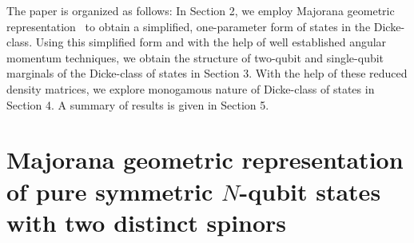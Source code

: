 \documentclass[pra,a4paper,showpacs,superscriptaddress]{revtex4}
\begin{document}
The paper is organized as follows: In Section 2, we employ Majorana geometric representation~\cite{maj,solano,bastin,usrmaj,ref2a,ref2b} to obtain a simplified, one-parameter form of states in the Dicke-class. Using this simplified form and with the help of well established angular momentum techniques, we obtain the structure of two-qubit and single-qubit marginals of the Dicke-class of states in Section 3. With the help of these reduced density matrices, 
we explore monogamous nature of Dicke-class of states in Section 4. 
A summary of results is given in Section 5. 

\section{Majorana geometric representation of pure symmetric $N$-qubit states with two distinct spinors} 
\end{document}
